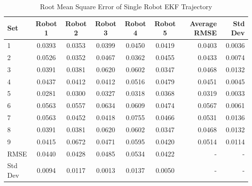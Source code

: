 \documentclass[12pt]{report}
\begin{document}
\begin{center}
\begin{table}[h]
  \caption{Root Mean Square Error of Single Robot EKF Trajectory}
  \begin{tabular}{| l | c | c | c | c | c || r ||r |}
    \hline Set & Robot 1 & Robot 2 & Robot 3 & Robot 4 & Robot 5 &
    Average RMSE & Std Dev \\ \hline \hline 1 & 0.0393 & 0.0353 &
    0.0399 & 0.0450 & 0.0419 & 0.0403 & 0.0036\\ \hline 2 & 0.0526 &
    0.0352 & 0.0467 & 0.0362 & 0.0455 & 0.0433 & 0.0074\\ \hline 3 &
    0.0391 & 0.0381 & 0.0620 & 0.0602 & 0.0347 & 0.0468 &
    0.0132\\ \hline 4 & 0.0437 & 0.0412 & 0.0412 & 0.0516 & 0.0479 &
    0.0451 & 0.0045\\ \hline 5 & 0.0281 & 0.0300 & 0.0327 & 0.0318 &
    0.0368 & 0.0319 & 0.0033\\ \hline 6 & 0.0563 & 0.0557 & 0.0634 &
    0.0609 & 0.0474 & 0.0567 & 0.0061\\ \hline 7 & 0.0563 & 0.0452 &
    0.0418 & 0.0755 & 0.0466 & 0.0531 & 0.0136\\ \hline 8 & 0.0391 &
    0.0381 & 0.0620 & 0.0602 & 0.0347 & 0.0468 & 0.0132\\ \hline 9 &
    0.0415 & 0.0672 & 0.0471 & 0.0595 & 0.0420 & 0.0514 &
    0.0114\\ \hline \hline RMSE & 0.0440 & 0.0428 & 0.0485 & 0.0534 &
    0.0422 & - & -\\ \hline Std Dev & 0.0094 & 0.0117 & 0.0013 &
    0.0137 & 0.0050 & - & -\\ \hline \hline
  \end{tabular}
  \end{table}
\end{center}
\end{document}
